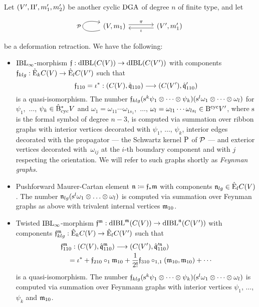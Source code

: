 \documentclass[\MainFolder/Text.tex]{subfiles}
\begin{document}
Let $(V',\Pi',m_1',m_2')$ be another cyclic $\mathrm{DGA}$ of degree $n$ of finite type, and let 
\begin{equation}\label{Eq:DefRetr}
\begin{tikzcd}[column sep=large]
(V,m_1)\arrow[loop left]{l}{\Htp}\arrow[shift left]{r}{\pi}&\arrow[shift left]{l}{\iota} (V',m_1')
\end{tikzcd}
\end{equation}
be a deformation retraction.
We have the following:
\begin{itemize}
    \item $\mathrm{IBL}_\infty$-morphism $\mathfrak{f}: \mathrm{dIBL}(C(V))\rightarrow \mathrm{dIBL}(C(V'))$ with components $\mathfrak{f}_{klg}: \hat{\mathrm{E}}_k C(V) \rightarrow \hat{\mathrm{E}}_l C(V')$ such that 
 $$ \mathfrak{f}_{110}=\iota^*: (C(V),\hat{\mathfrak{q}}_{110})\longrightarrow(C(V'),\hat{\mathfrak{q}}'_{110}) $$
 is a quasi-isomorphism.
 The number $\mathfrak{f}_{klg}(\mathrm{s}^k \psi_1\otimes\dotsb\otimes\psi_k)(\mathrm{s}^{l}\omega_1\otimes\dotsb\otimes\omega_l)$
for $\psi_1$,~$\dotsc$, $\psi_k \in \hat{\mathrm{B}}_{\mathrm{cyc}}^* V$ and $\omega_1 = \omega_{11}\dotsb\omega_{1 s_1}$,~$\dotsc$, $\omega_l = \omega_{l1}\dotsb\omega_{ls_l}\in \mathrm{B}^{\mathrm{cyc}} V'$, where $\mathrm{s}$ is the formal symbol of degree $n-3$, is computed via summation over ribbon graphs with interior vertices decorated with $\psi_1$, $\dotsc$, $\psi_k$, interior edges decorated with the propagator --- the Schwartz kernel $\mathrm{P}$ of $\mathcal{P}$ --- and exterior vertices decorated with~$\omega_{ij}$ at the $i$-th boundary component and with $j$ respecting the orientation.
We will refer to such graphs shortly as \emph{Feynman graphs.}
    \item Pushforward Maurer-Cartan element $\mathfrak{n} \coloneqq\mathfrak{f}_* \mathfrak{m}$ with components $\mathfrak{n}_{lg} \in \hat{\mathrm{E}}_lC(V)$.
    The number $\mathfrak{n}_{lg}(\mathrm{s}^l\omega_1\otimes \dotsc \otimes \omega_l)$ is computed via summation over Feynman graphs as above with trivalent internal vertices $\mathfrak{m}_{10}$.
    \item Twisted $\mathrm{IBL}_\infty$-morphism $\mathfrak{f}^{\mathfrak{m}}: \mathrm{dIBL}^{\mathfrak{m}}(C(V)) \rightarrow \mathrm{dIBL}^{\mathfrak{n}}(C(V'))$ with components $\mathfrak{f}^{\mathfrak{m}}_{klg}: \hat{\mathrm{E}}_k C(V) \rightarrow \hat{\mathrm{E}}_l C(V')$ such that
 $$\begin{multlined}[t]\HTP_{110}^\MC: (\CycC(V),\hat{\OPQ}_{110}^\MC)\longrightarrow(\CycC(V'),{\hat{\OPQ}'^\PMC}_{110}) \\ =\iota^* + \HTP_{210}\circ_1 \MC_{10} + \frac{1}{2!} \HTP_{310} \circ_{1,1}(\MC_{10}, \MC_{10}) + \dotsb\end{multlined} $$
is a quasi-isomorphism.
The number $\mathfrak{f}_{klg}(\mathrm{s}^k \psi_1\otimes\dotsb\otimes\psi_k)(\mathrm{s}^{l}\omega_1\otimes\dotsb\otimes\omega_l)$ is computed via summation over Feynmann graphs with interior vertices $\psi_1$, $\dotsc$, $\psi_k$ and $\mathfrak{m}_{10}$.
\end{itemize}
\end{document}
